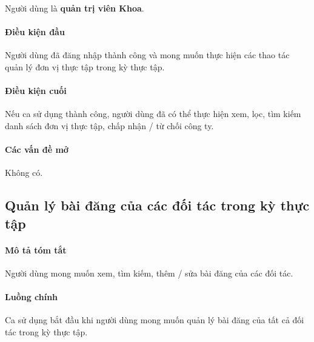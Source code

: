 \documentclass[./../main.tex]{subfiles}
\begin{document}
Người dùng là \textbf{quản trị viên Khoa}.

\paragraph*{Điều kiện đầu}

Người dùng đã đăng nhập thành công và mong muốn thực hiện các thao tác quản lý đơn vị thực tập trong kỳ thực tập.

\paragraph*{Điều kiện cuối}

Nếu ca sử dụng thành công, người dùng đã có thể thực hiện xem, lọc, tìm kiếm danh sách đơn vị thực tập, chấp nhận / từ chối công ty.

\paragraph*{Các vấn đề mở}

Không có.

\subsection{Quản lý bài đăng của các đối tác trong kỳ thực tập}

\paragraph*{Mô tả tóm tắt}

Người dùng mong muốn xem, tìm kiếm, thêm / sửa bài đăng của các đối tác.

\paragraph*{Luồng chính} Ca sử dụng bắt đầu khi người dùng mong muốn quản lý bài đăng của tất cả đối tác trong kỳ thực tập.
\end{document}
